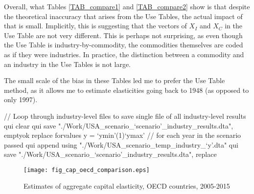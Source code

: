 Overall, what Tables \ref{TAB_compare1} and \ref{TAB_compare2} show is that despite the theoretical inaccuracy that arises from the Use Tables, the actual impact of that is small. Implicitly, this is suggesting that the vectors of $X_I$ and $X_C$ in the Use Table are not very different. This is perhaps not surprising, as even though the Use Table is industry-by-commodity, the commodities themselves are coded as if they were industries. In practice, the distinction between a commodity and an industry in the Use Tables is not large. 

The small scale of the bias in these Tables led me to prefer the Use Table method, as it allows me to estimate elasticities going back to 1948 (as opposed to only 1997).



	// Loop through industry-level files to save single file of all industry-level results
	qui clear
	qui save "./Work/USA_scenario_`scenario'_industry_results.dta", emptyok replace
	forvalues y = `ymin'(1)`ymax' { // for each year in the scenario passed
		qui append using "./Work/USA_scenario_temp_industry_`y'.dta"
	}
	qui save "./Work/USA_scenario_`scenario'_industry_results.dta", replace

\begin{figure}[!htb]
\begin{center}
\caption{Estimates of aggregate capital elasticity, OECD countries, 2005-2015}
\label{FIG_cap_oecd}
\texttt{[image: fig\_cap\_oecd\_comparison.eps]}
\end{center}
\vspace{-.5cm}
\end{figure}

\clearpage


